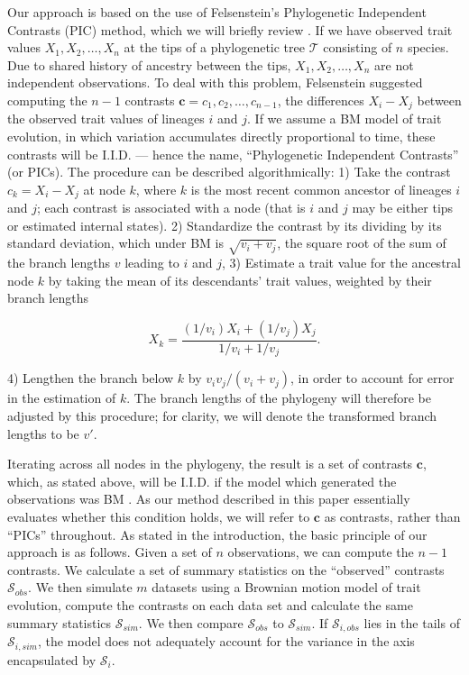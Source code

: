\documentclass[a4paper,12pt]{article}
\begin{document}
Our approach is based on the use of Felsenstein's \citep{Felsenstein1973, Felsenstein1985} Phylogenetic Independent Contrasts (PIC) method, which we will briefly review \citep[for more details, see][]{Felsenstein1985, Rohlf2001, Blomberg2012}. If we have observed trait values $X_1, X_2, \ldots, X_n$ at the tips of a phylogenetic tree $\mathcal{T}$ consisting of $n$ species. Due to shared history of ancestry between the tips, $X_1, X_2, \ldots, X_n$ are not independent observations. To deal with this problem, Felsenstein suggested computing the $n-1$ contrasts $\mathbf{c} = c_1, c_2, \ldots, c_{n-1}$, the differences $X_{i} - X_{j}$ between the observed trait values of lineages $i$ and $j$. If we assume a BM model of trait evolution, in which variation accumulates directly proportional to time, these contrasts will be I.I.D. --- hence the name, ``Phylogenetic Independent Contrasts'' (or PICs). The procedure can be described algorithmically: 1) Take the contrast $c_k = X_i - X_j$ at node $k$, where $k$ is the most recent common ancestor of lineages $i$ and $j$; each contrast is associated with a node (that is $i$ and $j$ may be either tips or estimated internal states). 2) Standardize the contrast by its dividing by its standard deviation, which under BM is $\sqrt{v_i + v_j}$, the square root of the sum of the branch lengths $v$ leading to $i$ and $j$, 3) Estimate a trait value for the ancestral node $k$ by taking the mean of its descendants' trait values, weighted by their branch lengths

\begin{equation}
X_k = \frac{(1 / v_i)X_i + (1 / v_j)X_j}{1/v_i + 1/v_j}.
\end{equation}

4) Lengthen the branch below $k$ by $v_i v_j / (v_i + v_j)$, in order to account for error in the estimation of $k$. The branch lengths of the phylogeny will therefore be adjusted by this procedure; for clarity, we will denote the transformed branch lengths to be $v\prime$.

Iterating across all nodes in the phylogeny, the result is a set of contrasts $\mathbf{c}$, which, as stated above, will be I.I.D. if the model which generated the observations was BM \citep{Felsenstein1985, Rohlf2001}. As our method described in this paper essentially evaluates whether this condition holds, we will refer to $\mathbf{c}$ as contrasts, rather than ``PICs'' throughout. As stated in the introduction, the basic principle of our approach is as follows. Given a set of $n$ observations, we can compute the $n-1$ contrasts. We calculate a set of summary statistics on the ``observed'' contrasts $\mathcal{S}_{obs}$. We then simulate $m$ datasets using a Brownian motion model of trait evolution, compute the contrasts on each data set and calculate the same summary statistics $\mathcal{S}_{sim}$. We then compare $\mathcal{S}_{obs}$ to $\mathcal{S}_{sim}$. If $\mathcal{S}_{i, obs}$ lies in the tails of $\mathcal{S}_{i, sim}$, the model does not adequately account for the variance in the axis encapsulated by $\mathcal{S}_i$.
\end{document}
